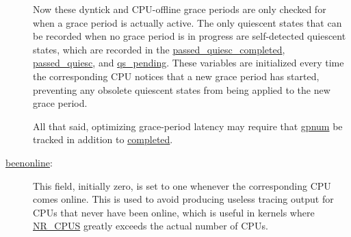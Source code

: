 \begin{description}
{	Now these dyntick and CPU-offline grace periods are only checked
	for when a grace period is actually active.
	The only quiescent states that can be recorded when no grace
	period is in progress are self-detected quiescent states,
	which are recorded in the \url{passed_quiesc_completed},
	\url{passed_quiesc}, and \url{qs_pending}.
	These variables are initialized every time the corresponding
	CPU notices that a new grace period has started, preventing
	any obsolete quiescent states from being applied to the
	new grace period.

	All that said, optimizing grace-period latency may require that
	\url{gpnum} be tracked in addition to \url{completed}.
} \QuickQuizEnd

\item[\url{beenonline}:]
	This field, initially zero, is set to one whenever the corresponding
	CPU comes online.
	This is used to avoid producing useless tracing output for CPUs
	that never have been online, which is useful in kernels where
	\url{NR_CPUS} greatly exceeds the actual number of CPUs.

 \QuickQuizEnd


\end{description}
